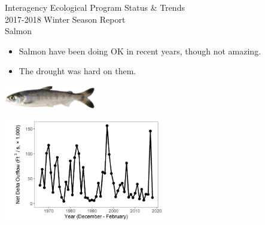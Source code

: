 \documentclass[]{article}\usepackage[]{graphicx}\usepackage[]{color}
\begin{document}
\newpage


\begin{Row}
  \begin{Cell}{7}
    \vspace{0.2cm}
    \begin{center}
      \doublespacing
      {\Large Interagency Ecological Program Status \& Trends } \\
      \vspace{0.2cm}
      {\Large 2017-2018 Winter Season Report} \\
      \vspace{0.5cm}
      {\Huge Salmon} \\
      \vspace{0.3cm}
      \singlespacing
      
			\begin{minipage}{240pt}
        \begin{center}
          \begin{itemize}[leftmargin=*]
              \item Salmon have been doing OK in recent years, though not amazing.
              \item The drought was hard on them.
          \end{itemize}
        \end{center}
			\end{minipage}
      
      \vspace{1cm}
      \includegraphics[width=4cm,trim=0 0 0 0,clip,align=m]{figures/salmon/photo_salmon.png}
    \end{center}
  \end{Cell}
  \begin{Cell}{6}
    \vspace{0.2cm}
    \begin{center}
      \includegraphics[width=7cm,trim=0 0 0 0,clip,align=m]{figures/outflow_tmp.png}
    \end{center}
  \end{Cell}
\end{Row}
\end{document}
